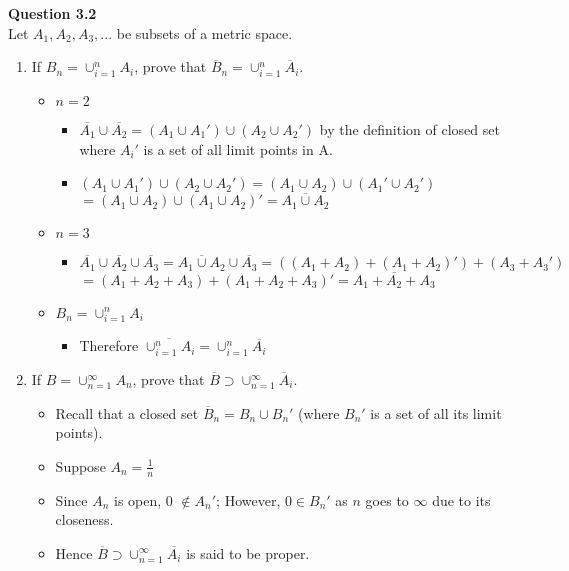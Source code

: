 \documentclass[12pt]{article}
\begin{document}
\newpage
\vspace{1.5\baselineskip}
\noindent
\textbf{Question 3.2}\\
Let $A_1, A_2, A_3, ...$ be subsets of a metric space.
\begin{enumerate}[label=(\roman*)]
    \item If $B_n= \cup_{i=1}^n A_i$, prove that $\overline{B}_n = \cup_{i=1}^n \overline{A}_i$.
        \begin{itemize}
            \item $n=2$
                \begin{itemize}
                    \item $\overline{A_1} \cup \overline{A_2} = (A_1 \cup A_1 ') \cup (A_2 \cup A_2')$ by the definition of closed set\\
                    where $A_i'$ is a set of all limit points in A.
                    \item $(A_1 \cup A_1 ') \cup (A_2 \cup A_2') = (A_1 \cup A_2) \cup (A_1' \cup A_2')$\\ $= (A_1 \cup A_2) \cup (A_1 \cup A_2)'
                    = \overline{A_1 \cup A_2}$
                \end{itemize}
            
            \item $n=3 $
                    \begin{itemize}
                        \item $\overline{A_1} \cup \overline{A_2} \cup \overline{A_3} = \overline{A_1 \cup A_2} \cup \overline{A_3} = ((A_1 + A_2)+(A_1 + A_2)') + (A_3 + A_3')$\\
                        $=(A_1 + A_2 + A_3) + (A_1 + A_2 + A_3)'= \overline{A_1+A_2+A_3}$
                    \end{itemize}
            
            \item $B_n = \cup_{i=1}^n A_i$
                \begin{itemize}
                    \item Therefore $\overline{\cup_{i=1}^n A_i} = \cup_{i=1}^n \overline{A_i}$
                \end{itemize}
        \end{itemize}
    
    \item If $B = \cup_{n=1}^\infty A_n$, prove that $\overline{B} \supset \cup_{n=1}^\infty \overline{A}_i$.
        \begin{itemize}
            \item Recall that a closed set $\overline{B}_n = B_n \cup B_n'$ \hfill (where $B_n'$ is a set of all its limit points).
            \item Suppose $A_n = \frac{1}{n}$ 
            \item Since $A_n$ is open, 0 $\notin A_n'$; However, $0 \in B_n'$ as $n$ goes to $\infty$ due to its closeness.
            \item Hence $\overline{B} \supset \cup_{n=1}^\infty \overline{A_i}$ is said to be proper.
        \end{itemize}
\end{enumerate}
\end{document}
